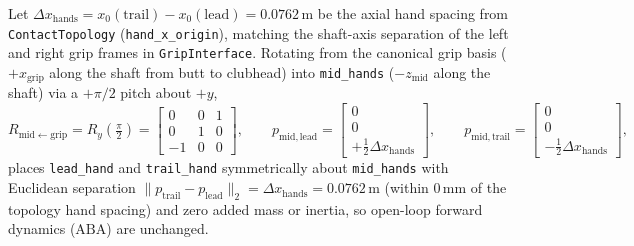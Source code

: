 \documentclass[11pt,a4paper]{article}
\begin{document}
Let $\Delta x_{\mathrm{hands}} = x_0(\mathrm{trail}) - x_0(\mathrm{lead}) = 0.0762\,\mathrm{m}$ be the axial hand spacing from \texttt{ContactTopology} (\texttt{hand\_x\_origin}), matching the shaft-axis separation of the left and right grip frames in \texttt{GripInterface}. Rotating from the canonical grip basis ($+x_{\mathrm{grip}}$ along the shaft from butt to clubhead) into \texttt{mid\_hands} ($-z_{\mathrm{mid}}$ along the shaft) via a $+\pi/2$ pitch about $+y$,
\begin{equation}
R_{\mathrm{mid}\leftarrow\mathrm{grip}} = R_y\!\left(\tfrac{\pi}{2}\right) =
\begin{bmatrix}
0 & 0 & 1 \\
0 & 1 & 0 \\
-1 & 0 & 0
\end{bmatrix}, \qquad
p_{\mathrm{mid},\mathrm{lead}} = \begin{bmatrix} 0 \\ 0 \\ +\tfrac{1}{2}\Delta x_{\mathrm{hands}} \end{bmatrix}, \qquad
p_{\mathrm{mid},\mathrm{trail}} = \begin{bmatrix} 0 \\ 0 \\ -\tfrac{1}{2}\Delta x_{\mathrm{hands}} \end{bmatrix},
\end{equation}
places \texttt{lead\_hand} and \texttt{trail\_hand} symmetrically about \texttt{mid\_hands} with Euclidean separation $\|p_{\mathrm{trail}} - p_{\mathrm{lead}}\|_2 = \Delta x_{\mathrm{hands}} = 0.0762\,\mathrm{m}$ (within $0\,\mathrm{mm}$ of the topology hand spacing) and zero added mass or inertia, so open-loop forward dynamics ($\mathrm{ABA}$) are unchanged.
\end{document}
